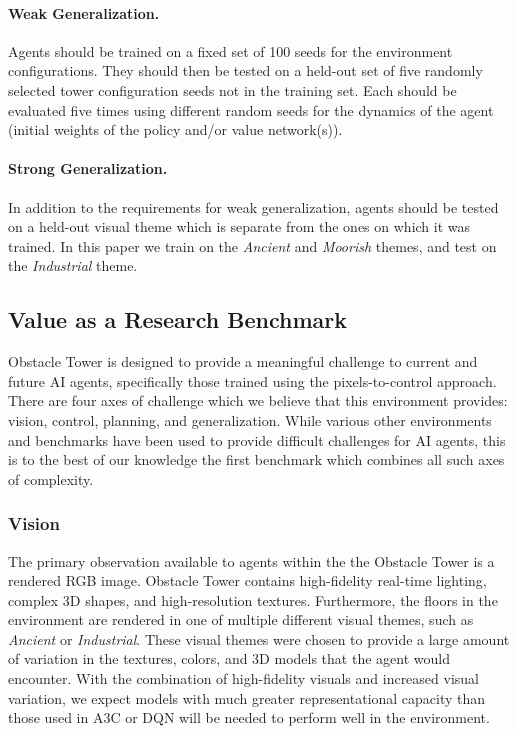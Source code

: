 \documentclass{article}
\begin{document}
\paragraph{Weak Generalization.} Agents should be trained on a fixed set of 100 seeds for the environment configurations. They should then be tested on a held-out set of five randomly selected tower configuration seeds not in the training set. Each should be evaluated five times using different random seeds for the dynamics of the agent (initial weights of the policy and/or value network(s)). 

\paragraph{Strong Generalization.} In addition to the requirements for weak generalization, agents should be tested on a held-out visual theme which is separate from the ones on which it was trained. In this paper we train on the \emph{Ancient} and \emph{Moorish} themes, and test on the \emph{Industrial} theme.

\subsection{Value as a Research Benchmark}
Obstacle Tower is designed to provide a meaningful challenge to current and future AI agents, specifically those trained using the pixels-to-control approach. There are four axes of challenge which we believe that this environment provides: vision, control, planning, and generalization. While various other environments and benchmarks have been used to provide difficult challenges for AI agents, this is to the best of our knowledge the first benchmark which combines all such axes of complexity. 
 


\subsubsection{Vision} The primary observation available to agents within the the Obstacle Tower is a rendered RGB image. Obstacle Tower contains high-fidelity real-time lighting, complex 3D shapes, and high-resolution textures. Furthermore, the floors in the environment are rendered in one of multiple different visual themes, such as \emph{Ancient} or \emph{Industrial}. These visual themes were chosen to provide a large amount of variation in the textures, colors, and 3D models that the agent would encounter. With the combination of high-fidelity visuals and increased visual variation, we expect models with much greater representational capacity than those used in A3C \cite{mnih2016asynchronous} or DQN \cite{mnih2015human} will be needed to perform well in the environment.
\end{document}
